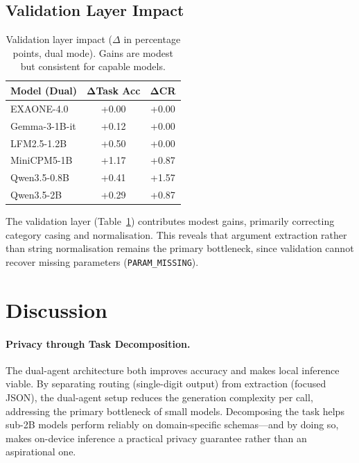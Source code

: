 \documentclass[11pt,twocolumn]{article}
\begin{document}
\subsection{Validation Layer Impact}

\begin{table}[t]
\centering
\small
\begin{tabular}{@{}lcc@{}}
\toprule
\textbf{Model (Dual)} &
$\boldsymbol{\Delta}$\textbf{Task Acc} &
$\boldsymbol{\Delta}$\textbf{CR} \\
\midrule
EXAONE-4.0     & +0.00 & +0.00 \\
Gemma-3-1B-it  & +0.12 & +0.00 \\
LFM2.5-1.2B    & +0.50 & +0.00 \\
MiniCPM5-1B    & +1.17 & +0.87 \\
Qwen3.5-0.8B   & +0.41 & +1.57 \\
Qwen3.5-2B     & +0.29 & +0.87 \\
\bottomrule
\end{tabular}
\caption{Validation layer impact ($\Delta$ in percentage points, dual
mode). Gains are modest but consistent for capable models.}
\label{tab:validation}
\end{table}

The validation layer (Table~\ref{tab:validation}) contributes modest
gains, primarily correcting category casing and normalisation.
This reveals that argument extraction rather than string normalisation
remains the primary bottleneck, since validation cannot recover
missing parameters (\texttt{PARAM\_MISSING}).

\section{Discussion}
\label{sec:discussion}

\paragraph{Privacy through Task Decomposition.}
The dual-agent architecture both improves accuracy and makes local
inference viable.
By separating routing (single-digit output) from extraction (focused
JSON), the dual-agent setup reduces the generation complexity per
call, addressing the primary bottleneck of small models.
Decomposing the task helps sub-2B models perform reliably on
domain-specific schemas---and by doing so, makes on-device inference
a practical privacy guarantee rather than an aspirational one.
\end{document}
